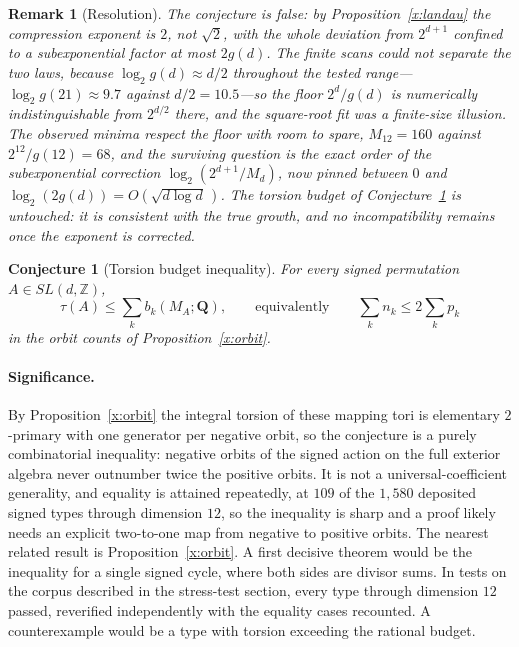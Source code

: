 \documentclass[11pt]{article}
\newtheorem{conjecture}{Conjecture}
\newtheorem{remark}{Remark}
\theoremstyle{definition}
\newcommand{\Z}{\mathbb Z}
\providecommand{\Z}{\mathbb Z}
\begin{document}
\begin{remark}[Resolution]\label{x19:res}
The conjecture is false: by Proposition~\ref{x:landau} the compression exponent is $2$, not $\sqrt2$, with the whole deviation from $2^{d+1}$ confined to a subexponential factor at most $2g(d)$.  The finite scans could not separate the two laws, because $\log_2g(d)\approx d/2$ throughout the tested range---$\log_2g(21)\approx9.7$ against $d/2=10.5$---so the floor $2^d/g(d)$ is numerically indistinguishable from $2^{d/2}$ there, and the square-root fit was a finite-size illusion.  The observed minima respect the floor with room to spare, $M_{12}=160$ against $2^{12}/g(12)=68$, and the surviving question is the exact order of the subexponential correction $\log_2(2^{d+1}/M_d)$, now pinned between $0$ and $\log_2(2g(d))=O(\sqrt{d\log d}\,)$.  The torsion budget of Conjecture~\ref{x20} is untouched: it is consistent with the true growth, and no incompatibility remains once the exponent is corrected.
\end{remark}

\begin{conjecture}[Torsion budget inequality]\label{x20}
For every signed permutation $A\in SL(d,\Z)$,
\[
\tau(A)\le\sum_kb_k(M_A;\mathbf Q),
\qquad\text{equivalently}\qquad
\sum_kn_k\le2\sum_kp_k
\]
in the orbit counts of Proposition~\ref{x:orbit}.
\end{conjecture}

\paragraph{Significance.}
By Proposition~\ref{x:orbit} the integral torsion of these mapping tori is elementary $2$-primary with one generator per negative orbit, so the conjecture is a purely combinatorial inequality: negative orbits of the signed action on the full exterior algebra never outnumber twice the positive orbits.  It is not a universal-coefficient generality, and equality is attained repeatedly, at $109$ of the $1{,}580$ deposited signed types through dimension $12$, so the inequality is sharp and a proof likely needs an explicit two-to-one map from negative to positive orbits.  The nearest related result is Proposition~\ref{x:orbit}.  A first decisive theorem would be the inequality for a single signed cycle, where both sides are divisor sums.  In tests on the corpus described in the stress-test section, every type through dimension $12$ passed, reverified independently with the equality cases recounted.  A counterexample would be a type with torsion exceeding the rational budget.
\end{document}
